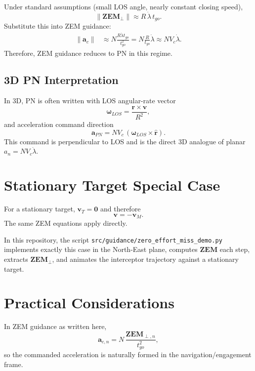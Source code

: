\documentclass[11pt,a4paper]{article}
\begin{document}
Under standard assumptions (small LOS angle, nearly constant closing speed),
\begin{equation}
\lVert \mathbf{ZEM}_{\perp} \rVert \approx R\,\dot{\lambda}\,t_{go}.
\end{equation}
Substitute this into ZEM guidance:
\begin{align}
\lVert \mathbf{a}_c \rVert
&\approx N\frac{R\dot{\lambda}t_{go}}{t_{go}^2}
= N\frac{R}{t_{go}}\dot{\lambda}
\approx N V_c \dot{\lambda}.
\end{align}
Therefore, ZEM guidance reduces to PN in this regime.

\subsection{3D PN Interpretation}
In 3D, PN is often written with LOS angular-rate vector
\begin{equation}
\boldsymbol{\omega}_{LOS} = \frac{\mathbf{r} \times \mathbf{v}}{R^2},
\end{equation}
and acceleration command direction
\begin{equation}
\mathbf{a}_{PN} = N V_c\,(\boldsymbol{\omega}_{LOS} \times \hat{\mathbf{r}}).
\end{equation}
This command is perpendicular to LOS and is the direct 3D analogue of planar $a_n = N V_c\dot{\lambda}$.

\section{Stationary Target Special Case}
For a stationary target, $\mathbf{v}_T=\mathbf{0}$ and therefore
\begin{equation}
\mathbf{v} = -\mathbf{v}_M.
\end{equation}
The same ZEM equations apply directly.

In this repository, the script
\texttt{src/guidance/zero\_effort\_miss\_demo.py}
implements exactly this case in the North-East plane,
computes $\mathbf{ZEM}$ each step, extracts $\mathbf{ZEM}_{\perp}$,
and animates the interceptor trajectory against a stationary target.

\section{Practical Considerations}
In ZEM guidance as written here,
\begin{equation}
\mathbf{a}_{c,n} = N\,\frac{\mathbf{ZEM}_{\perp,n}}{t_{go}^2},
\end{equation}
so the commanded acceleration is naturally formed in the navigation/engagement frame.
\end{document}
